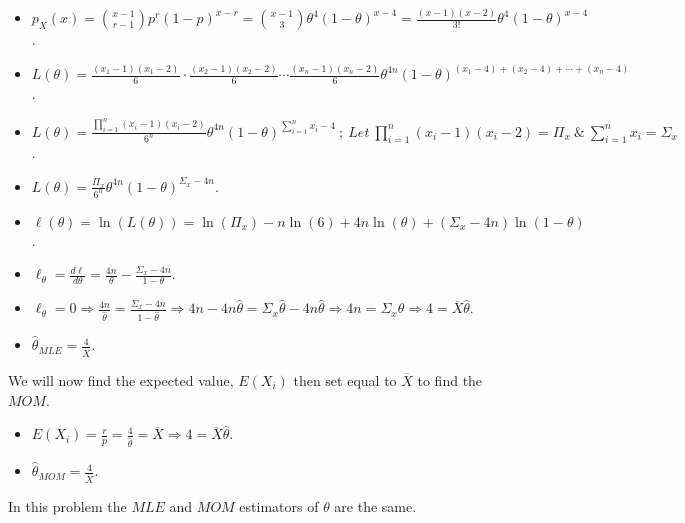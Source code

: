 \documentclass[12pt]{article}
\newcommand{\XB}{\color{black}}
\newcommand{\XBB}{\color{blue}}
\newcommand{\ds}{\displaystyle}
\begin{document}
\begin{itemize}
    \item $ \ds p_{X}(x) = \binom{x - 1}{r - 1}p^{r}(1 - p)^{x - r} = \binom{x - 1}{3}\theta^{4}(1 - \theta)^{x - 4} = \frac{(x - 1)(x - 2)}{3!}\theta^{4}(1 - \theta)^{x - 4} $.
    \item $ \ds L(\theta) = \frac{(x_{1} - 1)(x_{1} - 2)}{6} \cdot \frac{(x_{2} - 1)(x_{2} - 2)}{6} \cdots \frac{(x_{n} - 1)(x_{n} - 2)}{6} \theta^{4n}(1 - \theta)^{(x_{1} - 4) + (x_{2} - 4) + \cdots + (x_{n} - 4)} $.
    \item $ \ds L(\theta) = \frac{\prod_{i=1}^{n} (x_{i} - 1)(x_{i} - 2)}{6^{n}} \theta^{4n}(1 - \theta)^{\sum_{i = 1}^{n} x_{i} - 4} \ ; \ Let \ \prod_{i=1}^{n} (x_{i} - 1)(x_{i} - 2) = \Pi_{x}  \ \& \ \sum_{i = 1}^{n} x_{i} = \Sigma_{x} $.
    \item $ \ds L(\theta) = \frac{\Pi_{x}}{6^{n}} \theta^{4n}(1 - \theta)^{\Sigma_{x} - 4n} $.
    \item $ \ds \ell(\theta) = \ln(L(\theta)) = \ln(\Pi_{x}) - n\ln(6) + 4n\ln(\theta) + (\Sigma_{x} - 4n)\ln(1 - \theta) $.
    \item $ \ds \ell_{\theta} = \frac{d\ell}{d\theta}  = \frac{4n}{\theta} - \frac{\Sigma_{x} - 4n}{1 - \theta} $.
    \item $ \ds \ell_{\theta} = 0 \Rightarrow \frac{4n}{\hat{\theta}} = \frac{\Sigma_{x} - 4n}{1 - \hat{\theta}} \Rightarrow 4n - 4n\hat{\theta} = \Sigma_{x}\hat{\theta} - 4n\hat{\theta} \Rightarrow 4n = \Sigma_{x}\hat{\theta} \Rightarrow 4 = \overline{X}\hat{\theta}$.
    \item $ \ds \hat{\theta}_{MLE} = \frac{4}{\overline{X}} $.
\end{itemize}

\noindent
We will now find the expected value, $ E(X_{i}) $ then set equal to $ \overline{X} $ to find the $ MOM $. \\

\begin{itemize}
    \item $ \ds E(X_{i}) = \frac{r}{p} = \frac{4}{\hat{\theta}} = \overline{X} \Rightarrow 4 = \overline{X}\hat{\theta} $.
    \item $ \ds \hat{\theta}_{MOM} = \frac{4}{\overline{X}} $.
\end{itemize}

\noindent
In this problem the $ MLE $ and $ MOM $ estimators of $ \theta $ are the same. \\

\newpage
\XBB\hrulefill\XB \\
\end{document}
